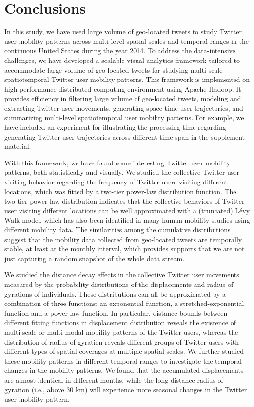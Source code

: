\documentclass[ijgi,article,accept,moreauthors,pdftex,10pt,a4paper]{mdpi}
\theoremstyle{mdpi}
\newcounter{ex}
\newcounter{re}
\theoremstyle{mdpidefinition}
\begin{document}
\section{Conclusions}
In this study, we have used large volume of geo-located tweets to study Twitter user mobility patterns across multi-level spatial scales and temporal ranges in the continuous United States during the year 2014. 
To address the data-intensive challenges, we have developed a scalable visual-analytics framework tailored to accommodate large volume of geo-located tweets for studying multi-scale spatiotemporal Twitter user mobility patterns.
This framework is implemented on high-performance distributed computing environment using Apache Hadoop.
It provides efficiency in filtering large volume of geo-located tweets, modeling and extracting Twitter user movements, generating space-time user trajectories, and summarizing multi-level spatiotemporal user mobility patterns. For example, we have included an experiment for illustrating the processing time regarding generating Twitter user trajectories across different time span in the supplement material.

With this framework, we have found some interesting Twitter user mobility patterns, both statistically and visually.
We studied the collective Twitter user visiting behavior regarding the frequency of Twitter users visiting different locations, which was fitted by a two-tier power-law distribution function.
The two-tier power law distribution indicates that the collective behaviors of Twitter user visiting different locations can be well approximated with a (truncated) L\'{e}vy Walk model, which has also been identified in many human mobility studies using different mobility data.
The similarities among the cumulative distributions suggest that the mobility data collected from geo-located tweets are temporally stable, at least at the monthly interval, which provides supports that we are not just capturing a random snapshot of the whole data stream. 

We studied the distance decay effects in the collective Twitter user movements measured by the probability distributions of the displacements and radius of gyrations of individuals. 
These distributions can all be approximated by a combination of three functions: an exponential function, a stretched-exponential function and a power-law function. In particular, distance bounds between different fitting functions in displacement distribution reveals the existence of multi-scale or multi-modal mobility patterns of the Twitter users, whereas the distribution of radius of gyration reveals different groups of Twitter users with different types of spatial coverages at multiple spatial scales.   
We further studied these mobility patterns in different temporal ranges to investigate the temporal changes in the mobility patterns. 
We found that the accumulated displacements are almost identical in different months, while the long distance radius of gyration (i.e., above 30 km) will experience more seasonal changes in the Twitter user mobility pattern.
\end{document}
